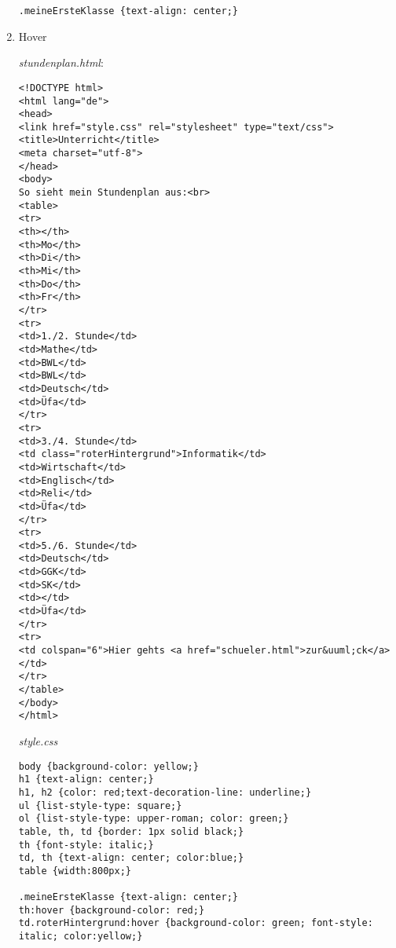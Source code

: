 \begin{enumerate}
\begin{lstlisting}
.meineErsteKlasse {text-align: center;}
    \end{lstlisting}
    \item Hover
    
    \textit{stundenplan.html}:
    \begin{lstlisting}
<!DOCTYPE html>
<html lang="de">
<head>
<link href="style.css" rel="stylesheet" type="text/css">
<title>Unterricht</title>
<meta charset="utf-8">
</head>
<body>
So sieht mein Stundenplan aus:<br>
<table>
<tr>
<th></th>
<th>Mo</th>
<th>Di</th>
<th>Mi</th>
<th>Do</th>
<th>Fr</th>
</tr>
<tr>
<td>1./2. Stunde</td>
<td>Mathe</td>
<td>BWL</td>
<td>BWL</td>
<td>Deutsch</td>
<td>Üfa</td>
</tr>
<tr>
<td>3./4. Stunde</td>
<td class="roterHintergrund">Informatik</td>
<td>Wirtschaft</td>
<td>Englisch</td>
<td>Reli</td>
<td>Üfa</td>
</tr>
<tr>
<td>5./6. Stunde</td>
<td>Deutsch</td>
<td>GGK</td>
<td>SK</td>
<td></td>
<td>Üfa</td>
</tr>
<tr>
<td colspan="6">Hier gehts <a href="schueler.html">zur&uuml;ck</a></td>
</tr>
</table>
</body>
</html>
    \end{lstlisting}
    \textit{style.css}
    \begin{lstlisting}
body {background-color: yellow;}
h1 {text-align: center;}
h1, h2 {color: red;text-decoration-line: underline;}
ul {list-style-type: square;}
ol {list-style-type: upper-roman; color: green;}
table, th, td {border: 1px solid black;}
th {font-style: italic;}
td, th {text-align: center; color:blue;}
table {width:800px;}

.meineErsteKlasse {text-align: center;}
th:hover {background-color: red;}
td.roterHintergrund:hover {background-color: green; font-style: italic; color:yellow;}
    \end{lstlisting}
\end{enumerate}
